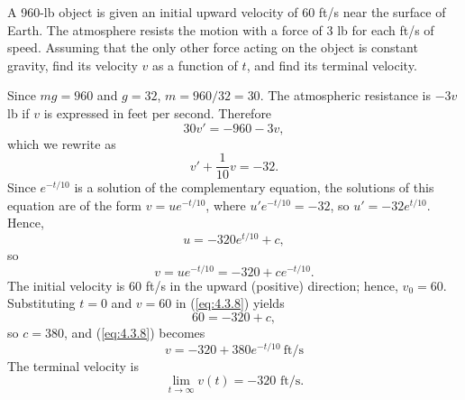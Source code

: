 \documentclass{ximera}
\begin{document}
\begin{example}\label{example:4.3.2}
A 960-lb object is given an initial upward velocity of 60 ft/s near
the surface of Earth. The atmosphere resists the motion with a force
of 3 lb for each ft/s of speed. Assuming that the only other force
acting on the object is constant gravity, find its velocity $v$ as a
function of $t$, and find its  terminal velocity.

\begin{explanation}
Since $mg=960$ and $g=32$,   $m=960/32=30$.  The atmospheric
resistance is $-3v$  lb if $v$ is expressed in feet
per second.  Therefore
$$
30v'=-960-3v,
$$
which we rewrite as
$$
v'+\frac{1}{10}v=-32.
$$
Since $e^{-t/10}$ is a solution of the complementary equation, the
solutions of this equation are of the form $v=ue^{-t/10}$, where
$u'e^{-t/10}=-32$, so $u'=-32e^{t/10}$. Hence,
$$
u=-320 e^{t/10}+c,
$$
so
\begin{equation} \label{eq:4.3.8}
v=ue^{-t/10}=-320+ce^{-t/10}.
\end{equation}
The initial velocity is 60 ft/s in the upward (positive) direction;
hence, $v_0=60$. Substituting $t=0$ and $v=60$ in (\ref{eq:4.3.8})
yields
$$
60=-320+c,
$$
 so $c=380$, and (\ref{eq:4.3.8}) becomes
$$
v=-320+380e^{-t/10}\ \mbox{ft/s}
$$
The terminal velocity is
$$
\lim_{t\to\infty}v(t)=-320\mbox{ ft/s.}
$$
\end{explanation}
\end{example}
\end{document}
